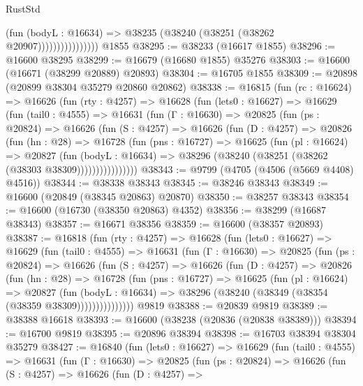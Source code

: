 \begin{lexlean}{RustStd}
\begin{coremodule}
{\begin{coremodule}
{{{{{{{{{{{{{{{{{{{{{{{{{{{{{{{{{{{{{{{{{{{{{{{{{{{{{{{                            (fun (bodyL : @16634) =>
                            @38235 (@38240 (@38251 (@38262 @20907))))))))))))))))
    @1855
@38295 := @38233 (@16617 @1855)
@38296 := @16600 @38295
@38299 := @16679 (@16680 @1855) @35276
@38303 := @16600 (@16671 (@38299 @20889) @20893)
@38304 := @16705 @1855
@38309 := @20898 (@20899 @38304 @35279 @20860 @20862)
@38338 := @16815
    (fun (rc : @16624) =>
    @16626
      (fun (rty : @4257) =>
      @16628
        (fun (lets0 : @16627) =>
        @16629
          (fun (tail0 : @4555) =>
          @16631
            (fun (Γ : @16630) =>
            @20825
              (fun (ps : @20824) =>
              @16626
                (fun (S : @4257) =>
                @16626
                  (fun (D : @4257) =>
                  @20826
                    (fun (hn : @28) =>
                    @16728
                      (fun (pns : @16727) =>
                      @16625
                        (fun (pl : @16624) =>
                        @20827
                          (fun (bodyL : @16634) =>
                          @38296 (@38240 (@38251 (@38262 (@38303 @38309))))))))))))))))
@38343 := @9799 (@4705 (@4506 (@5669 @4408) @4516))
@38344 := @38338 @38343
@38345 := @38246 @38343
@38349 := @16600 (@20849 (@38345 @20863) @20870)
@38350 := @38257 @38343
@38354 := @16600 (@16730 (@38350 @20863) @4352)
@38356 := @38299 (@16687 @38343)
@38357 := @16671 @38356
@38359 := @16600 (@38357 @20893)
@38387 := @16818
    (fun (rty : @4257) =>
    @16628
      (fun (lets0 : @16627) =>
      @16629
        (fun (tail0 : @4555) =>
        @16631
          (fun (Γ : @16630) =>
          @20825
            (fun (ps : @20824) =>
            @16626
              (fun (S : @4257) =>
              @16626
                (fun (D : @4257) =>
                @20826
                  (fun (hn : @28) =>
                  @16728
                    (fun (pns : @16727) =>
                    @16625
                      (fun (pl : @16624) =>
                      @20827
                        (fun (bodyL : @16634) =>
                        @38296 (@38240 (@38349 (@38354 (@38359 @38309)))))))))))))))
    @9819
@38388 := @20839 @9819
@38389 := @38388 @16618
@38393 := @16600 (@38238 (@20836 (@20838 @38389)))
@38394 := @16700 @9819
@38395 := @20896 @38394
@38398 := @16703 @38394 @38304 @35279
@38427 := @16840
    (fun (lets0 : @16627) =>
    @16629
      (fun (tail0 : @4555) =>
      @16631
        (fun (Γ : @16630) =>
        @20825
          (fun (ps : @20824) =>
          @16626
            (fun (S : @4257) =>
            @16626
              (fun (D : @4257) =>
}}}}}}}}}}}}}}}}}}}}}}}}}}}}}}}}}}}}}}}}}}}}}}}}}}}}}}}
\end{coremodule}}
\end{coremodule}
\end{lexlean}
